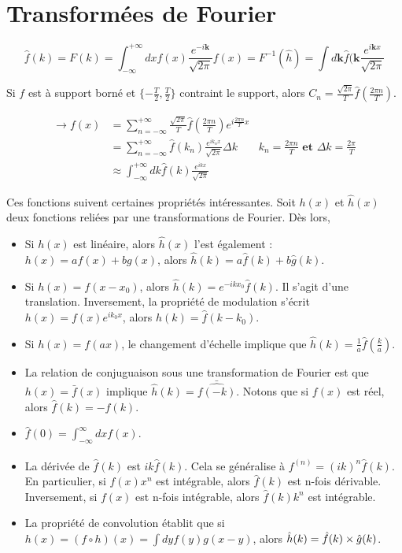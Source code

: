 \documentclass[../notesdecours.tex]{subfiles}
\begin{document}
\section{Transformées de Fourier}
\begin{subequations}
\begin{equation}
\hat{f}(k) = F(k) = \int_{-\infty}^{+\infty} dx f(x) \frac{e^{-i\bm{k}}}{\sqrt{2\pi}}
\end{equation}
\begin{equation}
f(x) = F^{-1}(\hat{h}) = \int d\bm{k}\hat{f}(\bm{k} \frac{e^{i\bm{k}x}}{\sqrt{2\pi}}
\end{equation}
\end{subequations}
\begin{remark}
Si $f$ est à support borné et $\{-\frac{T}{2},\frac{T}{2}\}$ contraint le support, alors $C_n = \frac{\sqrt{2\pi}}{T}\hat{f}(\frac{2\pi n}{T})$.
\end{remark}
\begin{align}
\rightarrow f(x) &= \sum_{n = -\infty}^{+\infty} \frac{\sqrt{2\pi}}{T}\hat{f}(\frac{2\pi n}{T})e^{i\frac{2\pi n}{T}x}\\
&= \sum_{n = -\infty}^{+\infty} \hat{f}(k_n)\frac{e^{ik_nx}}{\sqrt{2\pi}} \Delta k		&k_n = \frac{2\pi n}{T} \textbf{ et } \Delta k = \frac{2\pi}{T}\\
&\approx \int_{-\infty}^{+\infty} dk \hat{f}(k) \frac{e^{ikx}}{\sqrt{2\pi}}
\end{align}
\begin{remark}
Ces fonctions suivent certaines propriétés intéressantes. Soit $h(x)$ et $\hat{h}(x)$ deux fonctions reliées par une transformations de Fourier. Dès lors,
\begin{itemize}
\item Si $h(x)$ est linéaire, alors $\hat{h}(x)$ l'est également : $h(x) = af(x) + bg(x)$, alors $\hat{h}(k) = a\hat{f}(k) + b\hat{g}(k)$.
\item Si $h(x) = f(x-x_0)$, alors $\hat{h}(k) = e^{-ikx_0}\hat{f}(k)$. Il s'agit d'une translation. Inversement, la propriété de modulation s'écrit $h(x) = f(x)e^{ik_0x}$, alors $\hat{h}(k) = \hat{f}(k-k_0)$.
\item Si $h(x) = f(ax)$, le changement d'échelle implique que $\hat{h}(k) = \frac{1}{a}\hat{f}(\frac{k}{a})$.
\item La relation de conjuguaison sous une transformation de Fourier est que $h(x) = \bar{f}(x)$ implique $\hat{h}(k) = \bar{\hat{f(-k)}}$. Notons que si $f(x)$ est réel, alors $\hat{f}(k) = -\hat{f}(k)$.
\item $\hat{f}(0) = \int_{-\infty}^{\infty} dxf(x)$.
\item La dérivée de $\hat{f}(k)$ est $ik\hat{f}(k)$. Cela se généralise à $\hat{f^(n)} = (ik)^n\hat{f}(k)$. En particulier, si $f(x)x^n$ est intégrable, alors $\hat{f}(k)$ est n-fois dérivable. Inversement, si $f(x)$ est n-fois intégrable, alors $\hat{f}(k)k^n$ est intégrable.
\item La propriété de convolution établit que si $h(x) = (f\circ h)(x) = \int dy f(y)g(x-y)$, alors $\hat{h}(k) = \hat{f}(k)\times\hat{g}(k)$.
\end{itemize}

\end{remark}
\end{document}
